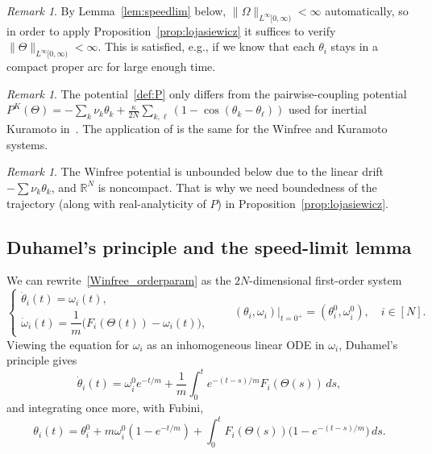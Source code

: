 \documentclass[11pt,reqno]{amsart}
\theoremstyle{definition}
\theoremstyle{remark}
\newtheorem{remark}[lemma]{Remark}
\begin{document}
\begin{remark}\label{rmk:velocity-bound}
By Lemma~\ref{lem:speedlim} below, $\|\Omega\|_{L^\infty[0,\infty)}<\infty$
automatically, so in order to apply
Proposition~\ref{prop:lojasiewicz} it suffices to verify
$\|\Theta\|_{L^\infty[0,\infty)}<\infty$. This is satisfied, e.g., if we know that each $\theta_i$
stays in a compact proper arc for large enough time.
\end{remark}

\begin{remark}
The potential~\eqref{def:P} only differs from the pairwise-coupling
potential
$P^K(\Theta)=-\sum_k\nu_k\theta_k+\tfrac{\kappa}{2N}\sum_{k,\ell}(1-\cos(\theta_k-\theta_\ell))$
used for inertial Kuramoto in~\cite{choi2014complete}. The application of \cite{haraux1998convergence,begout2015damped} is the same for the Winfree and Kuramoto systems.
\end{remark}
\begin{remark}
The Winfree potential is unbounded below
due to the linear drift $-\sum\nu_k\theta_k$, and $\mathbb{R}^N$ is noncompact. That is why we need boundedness of the trajectory (along with real-analyticity of $P$) in Proposition~\ref{prop:lojasiewicz}.

\end{remark}





\subsection{Duhamel's principle and the speed-limit lemma}\label{sec:duhamel}

We can rewrite~\eqref{Winfree_orderparam} as the $2N$-dimensional first-order
system
\begin{equation}\label{standardduhamel}
\begin{cases}
\dot\theta_i(t)=\omega_i(t),\\[2pt]
\dot\omega_i(t)=\dfrac{1}{m}\bigl(F_i(\Theta(t))-\omega_i(t)\bigr),
\end{cases}\qquad (\theta_i,\omega_i)\big|_{t=0^+}=(\theta_i^0,\omega_i^0),\quad i\in[N].
\end{equation}
Viewing the equation for $\omega_i$ as an inhomogeneous linear ODE in
$\omega_i$, Duhamel's principle gives
\begin{equation}\label{eq:duhamel}
\dot\theta_i(t)=\omega_i^0 e^{-t/m}+\frac{1}{m}\int_0^t e^{-(t-s)/m}F_i(\Theta(s))\,ds,
\end{equation}
and integrating once more, with Fubini,
\begin{equation}\label{eq:duhamel-theta}
\theta_i(t)=\theta_i^0+m\omega_i^0(1-e^{-t/m})+\int_0^t F_i(\Theta(s))\bigl(1-e^{-(t-s)/m}\bigr)\,ds.
\end{equation}
\end{document}
